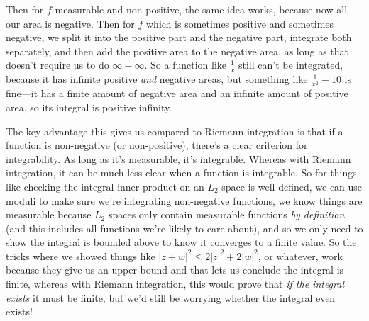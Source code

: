 \documentclass{article}
\begin{document}
Then for $f$ measurable and non-positive, the same idea works, because now all our area is negative. Then for $f$ which is sometimes positive and sometimes negative, we split it into the positive part and the negative part, integrate both separately, and then add the positive area to the negative area, as long as that doesn't require us to do $\infty-\infty$. So a function like $\frac{1}{x}$ still can't be integrated, because it has infinite positive \textit{and} negative areas, but something like $\frac{1}{x^2}-10$ is fine---it has a finite amount of negative area and an infinite amount of positive area, so its integral is positive infinity.

The key advantage this gives us compared to Riemann integration is that if a function is non-negative (or non-positive), there's a clear criterion for integrability. As long as it's measurable, it's integrable. Whereas with Riemann integration, it can be much less clear when a function is integrable. So for things like checking the integral inner product on an $L_2$ space is well-defined, we can use moduli to make sure we're integrating non-negative functions, we know things are measurable because $L_2$ spaces only contain measurable functions \textit{by definition} (and this includes all functions we're likely to care about), and so we only need to show the integral is bounded above to know it converges to a finite value. So the tricks where we showed things like $|z+w|^2\leq 2|z|^2+2|w|^2$, or whatever, work because they give us an upper bound and that lets us conclude the integral is finite, whereas with Riemann integration, this would prove that \textit{if the integral exists} it must be finite, but we'd still be worrying whether the integral even exists!
\end{document}
